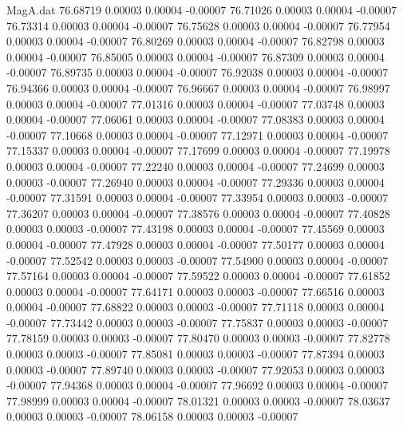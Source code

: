 \begin{filecontents}{MagA.dat}
  76.68719    0.00003    0.00004   -0.00007
  76.71026    0.00003    0.00004   -0.00007
  76.73314    0.00003    0.00004   -0.00007
  76.75628    0.00003    0.00004   -0.00007
  76.77954    0.00003    0.00004   -0.00007
  76.80269    0.00003    0.00004   -0.00007
  76.82798    0.00003    0.00004   -0.00007
  76.85005    0.00003    0.00004   -0.00007
  76.87309    0.00003    0.00004   -0.00007
  76.89735    0.00003    0.00004   -0.00007
  76.92038    0.00003    0.00004   -0.00007
  76.94366    0.00003    0.00004   -0.00007
  76.96667    0.00003    0.00004   -0.00007
  76.98997    0.00003    0.00004   -0.00007
  77.01316    0.00003    0.00004   -0.00007
  77.03748    0.00003    0.00004   -0.00007
  77.06061    0.00003    0.00004   -0.00007
  77.08383    0.00003    0.00004   -0.00007
  77.10668    0.00003    0.00004   -0.00007
  77.12971    0.00003    0.00004   -0.00007
  77.15337    0.00003    0.00004   -0.00007
  77.17699    0.00003    0.00004   -0.00007
  77.19978    0.00003    0.00004   -0.00007
  77.22240    0.00003    0.00004   -0.00007
  77.24699    0.00003    0.00003   -0.00007
  77.26940    0.00003    0.00004   -0.00007
  77.29336    0.00003    0.00004   -0.00007
  77.31591    0.00003    0.00004   -0.00007
  77.33954    0.00003    0.00003   -0.00007
  77.36207    0.00003    0.00004   -0.00007
  77.38576    0.00003    0.00004   -0.00007
  77.40828    0.00003    0.00003   -0.00007
  77.43198    0.00003    0.00004   -0.00007
  77.45569    0.00003    0.00004   -0.00007
  77.47928    0.00003    0.00004   -0.00007
  77.50177    0.00003    0.00004   -0.00007
  77.52542    0.00003    0.00003   -0.00007
  77.54900    0.00003    0.00004   -0.00007
  77.57164    0.00003    0.00004   -0.00007
  77.59522    0.00003    0.00004   -0.00007
  77.61852    0.00003    0.00004   -0.00007
  77.64171    0.00003    0.00003   -0.00007
  77.66516    0.00003    0.00004   -0.00007
  77.68822    0.00003    0.00003   -0.00007
  77.71118    0.00003    0.00004   -0.00007
  77.73442    0.00003    0.00003   -0.00007
  77.75837    0.00003    0.00003   -0.00007
  77.78159    0.00003    0.00003   -0.00007
  77.80470    0.00003    0.00003   -0.00007
  77.82778    0.00003    0.00003   -0.00007
  77.85081    0.00003    0.00003   -0.00007
  77.87394    0.00003    0.00003   -0.00007
  77.89740    0.00003    0.00003   -0.00007
  77.92053    0.00003    0.00003   -0.00007
  77.94368    0.00003    0.00004   -0.00007
  77.96692    0.00003    0.00004   -0.00007
  77.98999    0.00003    0.00004   -0.00007
  78.01321    0.00003    0.00003   -0.00007
  78.03637    0.00003    0.00003   -0.00007
  78.06158    0.00003    0.00003   -0.00007

\end{filecontents}
